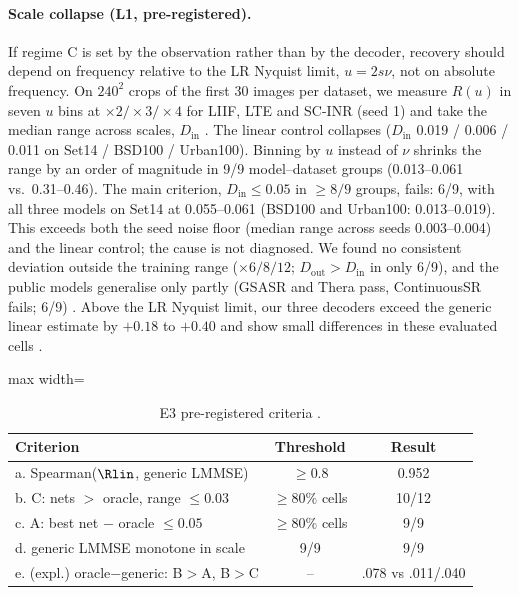 \paragraph{Scale collapse (L1, pre-registered).} If regime C is set by the
observation rather than by the decoder, recovery should depend on frequency
relative to the LR Nyquist limit, $u=2s\nu$, not on absolute frequency. On
$240^2$ crops of the first 30 images per dataset, we measure $R(u)$ in seven
$u$ bins at $\times2/\times3/\times4$ for LIIF, LTE and SC-INR (seed 1) and
take the median range across scales, $D_{\mathrm{in}}$ . The
linear control collapses ($D_{\mathrm{in}}$ 0.019 / 0.006 / 0.011 on Set14 /
BSD100 / Urban100). Binning by $u$ instead of $\nu$ shrinks the range by an
order of magnitude in 9/9 model--dataset groups (0.013--0.061 vs.\
0.31--0.46). The main criterion, $D_{\mathrm{in}}\le0.05$ in $\ge8/9$ groups,
fails: 6/9, with all three models on Set14 at 0.055--0.061 (BSD100 and
Urban100: 0.013--0.019). This exceeds both the seed noise floor (median range
across seeds 0.003--0.004) and the linear control; the cause is not
diagnosed. We found no consistent deviation outside the training range
($\times6/8/12$; $D_{\mathrm{out}}>D_{\mathrm{in}}$ in only 6/9), and the
public models generalise only partly (GSASR and Thera pass, ContinuousSR
fails; 6/9) . Above the LR Nyquist limit, our three decoders
exceed the generic linear estimate by $+0.18$ to $+0.40$ and show small differences in these evaluated cells \src{L1L2}.

\begin{table}[t]\centering\small
\caption{E3 pre-registered criteria .}\label{tab:e3}
\begin{adjustbox}{max width=\linewidth}\begin{tabular}{lcc}\toprule
Criterion & Threshold & Result\\\midrule
a. Spearman($\Rlin$, generic LMMSE) & $\ge0.8$ & 0.952\\
b. C: nets $>$ oracle, range $\le0.03$ & $\ge80\%$ cells & 10/12\\
c. A: best net $-$ oracle $\le0.05$ & $\ge80\%$ cells & 9/9\\
d. generic LMMSE monotone in scale & 9/9 & 9/9\\
e. (expl.) oracle$-$generic: B$>$A, B$>$C & -- & .078 vs .011/.040\\
\bottomrule\end{tabular}\end{adjustbox}
\end{table}

